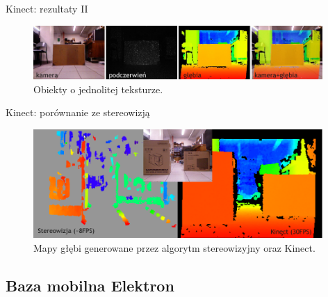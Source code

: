 \documentclass[xcolor=x11names,compress]{beamer}
\renewcommand{\(}{\begin{columns}}
\renewcommand{\)}{\end{columns}}
\newcommand{\<}[1]{\begin{column}{#1}}
\renewcommand{\>}{\end{column}}
\begin{document}
\begin{frame}{Kinect: rezultaty II}

    \begin{figure}[h!]
    \centering
    \includegraphics[width=11cm]{../Common/img/kinect_3}
    \caption{Obiekty o jednolitej teksturze.}
    \end{figure}

\end{frame}


\begin{frame}{Kinect: porównanie ze stereowizją}

    \begin{figure}[h!]
    \centering
    \includegraphics[width=11cm]{../Common/img/kinect_vs_stereo}
    \caption{Mapy głębi generowane przez algorytm stereowizyjny oraz Kinect.}
    \end{figure}

\end{frame}

\subsection{\vspace{.3cm}Baza mobilna Elektron}
\end{document}
